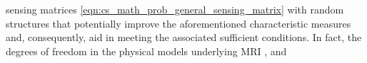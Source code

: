 sensing matrices
\eqref{eqn:cs_math_prob_general_sensing_matrix} with
random structures that
potentially improve
the aforementioned characteristic measures and, consequently, aid in
meeting the associated sufficient conditions.
In fact,
the degrees of
freedom in
the physical models underlying
\ac{MRI}
\cite[11, 12]{book:Foucart2013},
\cite{article:LustigMRM2007} and
